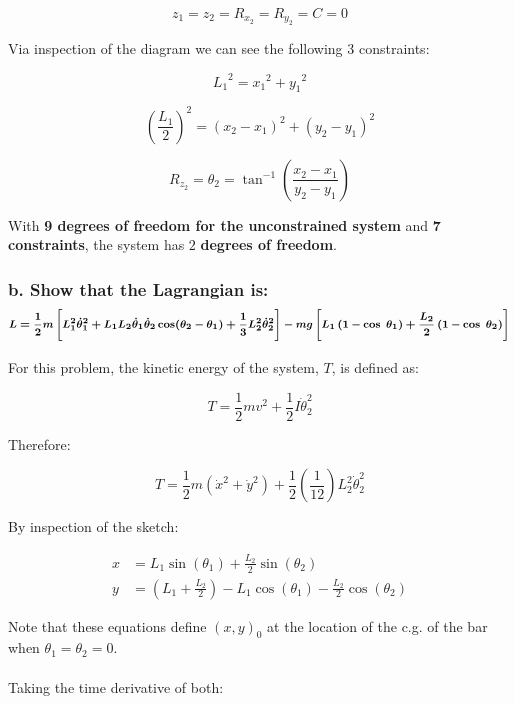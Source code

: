 \documentclass[12pt, letterpaper]{../assignment}
\begin{document}
$$z_1 = z_2= R_{x_2} = R_{y_2} = C =0$$

Via inspection of the diagram we can see the following 3 constraints:

$$ {L_1}^2  = {x_1}^2  + {y_1}^2 $$

$$ \left(\frac{L_1}{2}\right)^2  = \left({x_2}-{x_1}\right)^2  + \left({y_2}-{y_1}\right)^2 $$

$$ R_{z_2}= \theta_2 = \tan^{-1}\left( \frac{{x_2}-{x_1}}{{y_2}-{y_1}} \right) $$

\begin{answer}
With \textbf{9 degrees of freedom for the unconstrained system} and \textbf{7 constraints},
the system has $2$ \textbf{degrees of freedom}.
\end{answer}

\subsubsection*{b. Show that the Lagrangian is:
$$ \footnotesize \bm{L = \frac{1}{2}m\left[
    L_1^2 \dot{\theta}_1^2 +
    L_1 L_2 \dot{\theta}_1 \dot{\theta}_2 \cos(\theta_2-\theta_1) + 
    \frac{1}{3} {L}_2^2 \dot{\theta}_2^2
\right] - 
mg\left[ L_1 \left( 1 - \cos \ \theta_1  \right) + 
\frac{L_2}{2} \left( 1 - \cos\ \theta_2  \right)\right]} $$ }

For this problem, the kinetic energy of the system, $T$, is defined as:

$$ T = \frac{1}{2} m v^2 + \frac{1}{2} I \dot{\theta}_2^2 $$

Therefore:

$$ T = \frac{1}{2} m \left(\dot{x}^2 + \dot{y}^2\right) + \frac{1}{2}\left(\frac{1}{12}\right) L_2^2 \dot{\theta}_2^2 $$

By inspection of the sketch:

\begin{equation*}
\begin{aligned}
x &= L_1 \sin(\theta_1)+ \frac{L_2}{2} \sin(\theta_2)\\
y &= \left(L_1 + \frac{L_2}{2}\right) - L_1 \cos(\theta_1)- \frac{L_2}{2}\cos(\theta_2)
\end{aligned}
\end{equation*}

Note that these equations define $(x,y)_0$ at the location of the c.g. of the bar when $\theta_1 = \theta_2 = 0$.
\\\\

Taking the time derivative of both:
\end{document}
